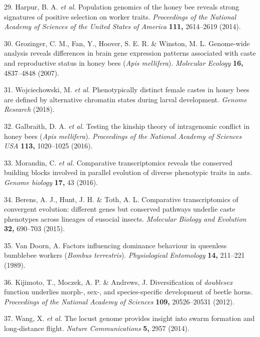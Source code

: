 \documentclass[12pt,]{article}
\begin{document}
\hypertarget{ref-Harpur:2014hk}{}
29. Harpur, B. A. \emph{et al.} Population genomics of the honey bee
reveals strong signatures of positive selection on worker traits.
\emph{Proceedings of the National Academy of Sciences of the United
States of America} \textbf{111,} 2614--2619 (2014).

\hypertarget{ref-Grozinger:2007ki}{}
30. Grozinger, C. M., Fan, Y., Hoover, S. E. R. \& Winston, M. L.
Genome-wide analysis reveals differences in brain gene expression
patterns associated with caste and reproductive status in honey bees
(\emph{Apis mellifera}). \emph{Molecular Ecology} \textbf{16,}
4837--4848 (2007).

\hypertarget{ref-wojciechowski2018ph}{}
31. Wojciechowski, M. \emph{et al.} Phenotypically distinct female
castes in honey bees are defined by alternative chromatin states during
larval development. \emph{Genome Research} (2018).

\hypertarget{ref-Galbraith:2016gz}{}
32. Galbraith, D. A. \emph{et al.} Testing the kinship theory of
intragenomic conflict in honey bees (\emph{Apis mellifera}).
\emph{Proceedings of the National Academy of Sciences USA} \textbf{113,}
1020--1025 (2016).

\hypertarget{ref-Morandin:2016jd}{}
33. Morandin, C. \emph{et al.} Comparative transcriptomics reveals the
conserved building blocks involved in parallel evolution of diverse
phenotypic traits in ants. \emph{Genome biology} \textbf{17,} 43 (2016).

\hypertarget{ref-Berens:2015hg}{}
34. Berens, A. J., Hunt, J. H. \& Toth, A. L. Comparative
transcriptomics of convergent evolution: different genes but conserved
pathways underlie caste phenotypes across lineages of eusocial insects.
\emph{Molecular Biology and Evolution} \textbf{32,} 690--703 (2015).

\hypertarget{ref-doorn1989fa}{}
35. Van Doorn, A. Factors influencing dominance behaviour in queenless
bumblebee workers (\emph{Bombus terrestris}). \emph{Physiological
Entomology} \textbf{14,} 211--221 (1989).

\hypertarget{ref-kijimoto2012div}{}
36. Kijimoto, T., Moczek, A. P. \& Andrews, J. Diversification of
\emph{doublesex} function underlies morph-, sex-, and species-specific
development of beetle horns. \emph{Proceedings of the National Academy
of Sciences} \textbf{109,} 20526--20531 (2012).

\hypertarget{ref-wang2014lo}{}
37. Wang, X. \emph{et al.} The locust genome provides insight into swarm
formation and long-distance flight. \emph{Nature Communications}
\textbf{5,} 2957 (2014).
\end{document}
